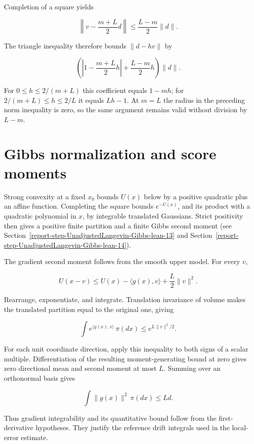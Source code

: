 \documentclass[11pt,a4paper]{report}
\begin{document}
Completion of a square yields

\[\left\|v-\frac{m+L}{2}d\right\|\le\frac{L-m}{2}\|d\|.\]

The triangle inequality therefore bounds \(\|d-hv\|\) by

\[\left(\left|1-\frac{m+L}{2}h\right|+\frac{L-m}{2}h\right)\|d\|.\]

For \(0\le h\le2/(m+L)\) this coefficient equals \(1-mh\); for \(2/(m+L)\le h\le2/L\) it equals \(Lh-1\). At \(m=L\) the radius in the preceding norm inequality is zero, so the same argument remains valid without division by \(L-m\).


\section{\texorpdfstring{Gibbs normalization and score moments}{Gibbs normalization and score moments}}



Strong convexity at a fixed \(x_0\) bounds \(U(x)\) below by a positive quadratic plus an affine function. Completing the square bounds \(e^{-U(x)}\), and its product with a quadratic polynomial in \(x\), by integrable translated Gaussians. Strict positivity then gives a positive finite partition and a finite Gibbs second moment (see Section~\ref{report-step-UnadjustedLangevin-Gibbs-lean-13} and Section~\ref{report-step-UnadjustedLangevin-Gibbs-lean-14}).



The gradient second moment follows from the smooth upper model. For every \(v\),

\[U(x-v)\le U(x)-\langle g(x),v\rangle+\frac L2\|v\|^2.\]

Rearrange, exponentiate, and integrate. Translation invariance of volume makes the translated partition equal to the original one, giving

\[\int e^{\langle g(x),v\rangle}\,\pi(dx)\le e^{L\|v\|^2/2}.\]

For each unit coordinate direction, apply this inequality to both signs of a scalar multiple. Differentiation of the resulting moment-generating bound at zero gives zero directional mean and second moment at most \(L\). Summing over an orthonormal basis gives

\[\int\|g(x)\|^2\,\pi(dx)\le Ld.\]

Thus gradient integrability and its quantitative bound follow from the first-derivative hypotheses. They justify the reference drift integrals used in the local-error estimate.
\end{document}
